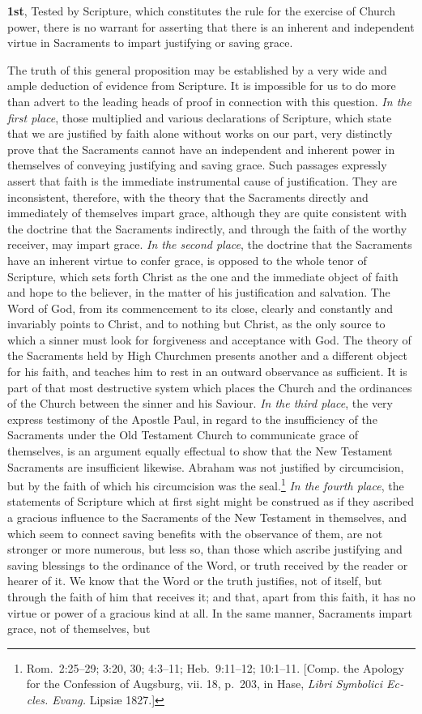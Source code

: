 \documentclass[
  english,
]{book}
\providecommand{\textlatin}{}
\renewcommand{\textlatin}[2][]{\foreignlanguage{latin}{#2}}
\begin{document}
\textbf{1st}, Tested by Scripture, which constitutes the rule for the exercise of Church power, there is no warrant for asserting that there is an inherent and independent virtue in Sacraments to impart justifying or saving grace.

The truth of this general proposition may be established by a very wide and ample deduction of evidence from Scripture. It is impossible for us to do more than advert to the leading heads of proof in connection with this question. \emph{In the first place}, those multiplied and various declarations of Scripture, which state that we are justified by faith alone without works on our part, very distinctly prove that the Sacraments cannot have an independent and inherent power in themselves of conveying justifying and saving grace. Such passages expressly assert that faith is the immediate instrumental cause of justification. They are inconsistent, therefore, with the theory that the Sacraments directly and immediately of themselves impart grace, although they are quite consistent with the doctrine that the Sacraments indirectly, and through the faith of the worthy receiver, may impart grace. \emph{In the second place}, the doctrine that the Sacraments have an inherent virtue to confer grace, is opposed to the whole tenor of Scripture, which sets forth Christ as the one and the immediate object of faith and hope to the believer, in the matter of his justification and salvation. The Word of God, from its commencement to its close, clearly and constantly and invariably points to Christ, and to nothing but Christ, as the only source to which a sinner must look for forgiveness and acceptance with God. The theory of the Sacraments held by High Churchmen presents another and a different object for his faith, and teaches him to rest in an outward observance as sufficient. It is part of that most destructive system which places the Church and the ordinances of the Church between the sinner and his Saviour. \emph{In the third place}, the very express testimony of the Apostle Paul, in regard to the insufficiency of the Sacraments under the Old Testament Church to communicate grace of themselves, is an argument equally effectual to show that the New Testament Sacraments are insufficient likewise. Abraham was not justified by circumcision, but by the faith of which his circumcision was the seal.\footnote{Rom.~2:25--29; 3:20, 30; 4:3--11; Heb.~9:11--12; 10:1--11. {[}Comp. the Apology for the Confession of Augsburg, vii. 18, p.~203, in Hase, \textlatin{\emph{Libri Symbolici Eccles. Evang.} Lipsiæ} 1827.{]}} \emph{In the fourth place}, the statements of Scripture which at first sight might be construed as if they ascribed a gracious influence to the Sacraments of the New Testament in themselves, and which seem to connect saving benefits with the observance of them, are not stronger or more numerous, but less so, than those which ascribe justifying and saving blessings to the ordinance of the Word, or truth received by the reader or hearer of it. We know that the Word or the truth justifies, not of itself, but through the faith of him that receives it; and that, apart from this faith, it has no virtue or power of a gracious kind at all. In the same manner, Sacraments impart grace, not of themselves, but 
\end{document}
